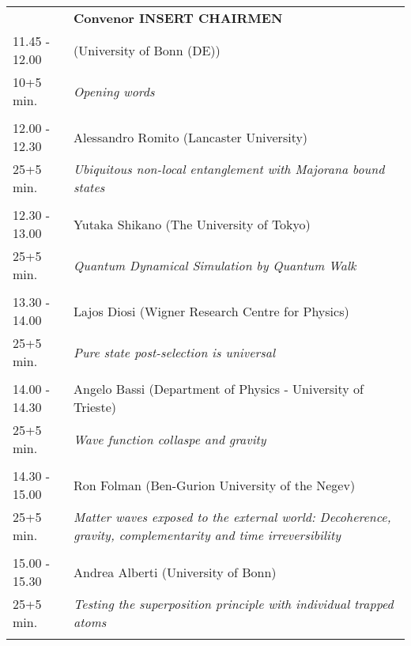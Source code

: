 \begin{longtable}{p{3cm}p{13cm}}
&\hfill {\bf Convenor INSERT CHAIRMEN }\\ 
11.45 - 12.00 &  (University of Bonn (DE))\\ 
10+5 min. & {\it Opening words}\\ 
 & \\ 
12.00 - 12.30 & Alessandro Romito (Lancaster University)\\ 
25+5 min. & {\it Ubiquitous non-local entanglement with Majorana bound states}\\ 
 & \\ 
12.30 - 13.00 & Yutaka Shikano (The University of Tokyo)\\ 
25+5 min. & {\it Quantum Dynamical Simulation by Quantum Walk}\\ 
 & \\ 
13.30 - 14.00 & Lajos Diosi (Wigner Research Centre for Physics)\\ 
25+5 min. & {\it Pure state post-selection is universal}\\ 
 & \\ 
14.00 - 14.30 & Angelo Bassi (Department of Physics - University of Trieste)\\ 
25+5 min. & {\it Wave function collaspe and gravity}\\ 
 & \\ 
14.30 - 15.00 & Ron Folman (Ben-Gurion University of the Negev)\\ 
25+5 min. & {\it Matter waves exposed to the external world: Decoherence, gravity, complementarity and time irreversibility}\\ 
 & \\ 
15.00 - 15.30 & Andrea Alberti (University of Bonn)\\ 
25+5 min. & {\it Testing the superposition principle with individual trapped atoms}\\ 
 & \\ 
\end{longtable}

